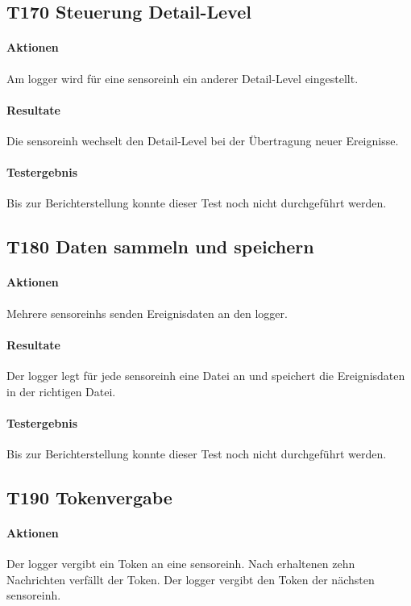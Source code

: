 \subsection{T170 Steuerung Detail-Level}
\paragraph{Aktionen} Am \gls{logger} wird für eine \gls{sensoreinh} ein anderer Detail-Level eingestellt.

\paragraph{Resultate} Die \gls{sensoreinh} wechselt den Detail-Level bei der Übertragung neuer Ereignisse.

\paragraph{Testergebnis} Bis zur Berichterstellung konnte dieser Test noch nicht durchgeführt werden.

\subsection{T180 Daten sammeln und speichern}
\paragraph{Aktionen} Mehrere \glspl{sensoreinh} senden Ereignisdaten an den \gls{logger}. 

\paragraph{Resultate} Der \gls{logger} legt für jede \gls{sensoreinh} eine Datei an und speichert die Ereignisdaten in der richtigen Datei.

\paragraph{Testergebnis} Bis zur Berichterstellung konnte dieser Test noch nicht durchgeführt werden.

\subsection{T190 Tokenvergabe}
\paragraph{Aktionen} Der \gls{logger} vergibt ein Token an eine \gls{sensoreinh}. Nach erhaltenen zehn Nachrichten verfällt der Token. Der \gls{logger} vergibt den Token der nächsten \gls{sensoreinh}.

